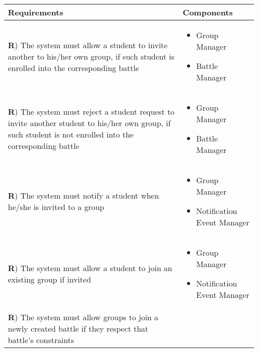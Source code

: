 \documentclass[../DD.tex]{subfiles}
\newcounter{rown}
\newcommand{\rowIndex}{\arabic{rown}\stepcounter{rown}}
\begin{document}
    \begin{table}[h!]
        \begin{center}
            \hspace*{-2cm}
            \begin{tabular}{|m{20em}|m{20em}|}
            \hline
            \textbf{Requirements} & \textbf{Components}\\
            \hline
            \textbf{R\rowIndex}) The system must allow a student to invite another to his/her own group, if such student is enrolled into the corresponding battle & \begin{itemize}
                \item Group Manager
                \item Battle Manager
            \end{itemize}\\
            \hline
            \textbf{R\rowIndex}) The system must reject a student request to invite another student to his/her own group, if such student is not enrolled into the corresponding battle & \begin{itemize}
                \item Group Manager
                \item Battle Manager 
            \end{itemize}\\
            \hline
            \textbf{R\rowIndex}) The system must notify a student when he/she is invited to a group & \begin{itemize}
                \item Group Manager
                \item Notification Event Manager 
            \end{itemize}\\
            \hline
            \textbf{R\rowIndex}) The system must allow a student to join an existing group if invited & \begin{itemize}
                \item Group Manager
                \item Notification Event Manager 
            \end{itemize}\\
            \hline
            \textbf{R\rowIndex}) The system must allow groups to join a newly created battle if they respect that battle's constraints & \begin{itemize}

\end{itemize}
\end{tabular}
\end{center}
\end{table}
\end{document}
